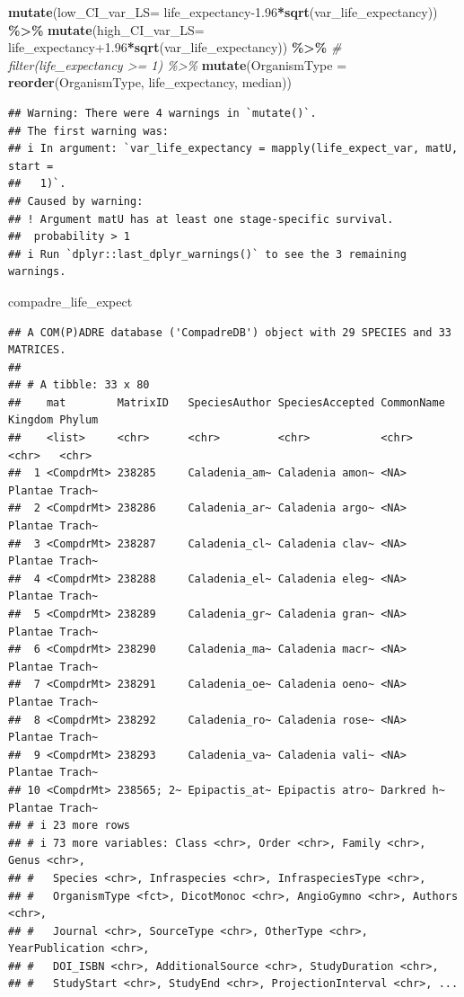 \documentclass[
]{book}
\newenvironment{Shaded}{\begin{snugshade}}{\end{snugshade}}
\newcommand{\AttributeTok}[1]{\textcolor[rgb]{0.13,0.29,0.53}{#1}}
\newcommand{\CommentTok}[1]{\textcolor[rgb]{0.56,0.35,0.01}{\textit{#1}}}
\newcommand{\FloatTok}[1]{\textcolor[rgb]{0.00,0.00,0.81}{#1}}
\newcommand{\FunctionTok}[1]{\textcolor[rgb]{0.13,0.29,0.53}{\textbf{#1}}}
\newcommand{\NormalTok}[1]{#1}
\newcommand{\SpecialCharTok}[1]{\textcolor[rgb]{0.81,0.36,0.00}{\textbf{#1}}}
\theoremstyle{definition}
\theoremstyle{definition}
\theoremstyle{definition}
\theoremstyle{definition}
\theoremstyle{remark}
\begin{document}
\begin{Shaded}
\begin{Highlighting}[]
  \FunctionTok{mutate}\NormalTok{(}\AttributeTok{low\_CI\_var\_LS=}\NormalTok{ life\_expectancy}\FloatTok{{-}1.96}\SpecialCharTok{*}\FunctionTok{sqrt}\NormalTok{(var\_life\_expectancy)) }\SpecialCharTok{\%\textgreater{}\%} 
  \FunctionTok{mutate}\NormalTok{(}\AttributeTok{high\_CI\_var\_LS=}\NormalTok{ life\_expectancy}\FloatTok{+1.96}\SpecialCharTok{*}\FunctionTok{sqrt}\NormalTok{(var\_life\_expectancy)) }\SpecialCharTok{\%\textgreater{}\%} 
 \CommentTok{\# filter(life\_expectancy \textgreater{}= 1) \%\textgreater{}\% }
  \FunctionTok{mutate}\NormalTok{(}\AttributeTok{OrganismType =} \FunctionTok{reorder}\NormalTok{(OrganismType, life\_expectancy, median)) }
\end{Highlighting}
\end{Shaded}

\begin{verbatim}
## Warning: There were 4 warnings in `mutate()`.
## The first warning was:
## i In argument: `var_life_expectancy = mapply(life_expect_var, matU, start =
##   1)`.
## Caused by warning:
## ! Argument matU has at least one stage-specific survival.
##  probability > 1
## i Run `dplyr::last_dplyr_warnings()` to see the 3 remaining warnings.
\end{verbatim}

\begin{Shaded}
\begin{Highlighting}[]
\NormalTok{compadre\_life\_expect}
\end{Highlighting}
\end{Shaded}

\begin{verbatim}
## A COM(P)ADRE database ('CompadreDB') object with 29 SPECIES and 33 MATRICES.
## 
## # A tibble: 33 x 80
##    mat        MatrixID   SpeciesAuthor SpeciesAccepted CommonName Kingdom Phylum
##    <list>     <chr>      <chr>         <chr>           <chr>      <chr>   <chr> 
##  1 <CompdrMt> 238285     Caladenia_am~ Caladenia amon~ <NA>       Plantae Trach~
##  2 <CompdrMt> 238286     Caladenia_ar~ Caladenia argo~ <NA>       Plantae Trach~
##  3 <CompdrMt> 238287     Caladenia_cl~ Caladenia clav~ <NA>       Plantae Trach~
##  4 <CompdrMt> 238288     Caladenia_el~ Caladenia eleg~ <NA>       Plantae Trach~
##  5 <CompdrMt> 238289     Caladenia_gr~ Caladenia gran~ <NA>       Plantae Trach~
##  6 <CompdrMt> 238290     Caladenia_ma~ Caladenia macr~ <NA>       Plantae Trach~
##  7 <CompdrMt> 238291     Caladenia_oe~ Caladenia oeno~ <NA>       Plantae Trach~
##  8 <CompdrMt> 238292     Caladenia_ro~ Caladenia rose~ <NA>       Plantae Trach~
##  9 <CompdrMt> 238293     Caladenia_va~ Caladenia vali~ <NA>       Plantae Trach~
## 10 <CompdrMt> 238565; 2~ Epipactis_at~ Epipactis atro~ Darkred h~ Plantae Trach~
## # i 23 more rows
## # i 73 more variables: Class <chr>, Order <chr>, Family <chr>, Genus <chr>,
## #   Species <chr>, Infraspecies <chr>, InfraspeciesType <chr>,
## #   OrganismType <fct>, DicotMonoc <chr>, AngioGymno <chr>, Authors <chr>,
## #   Journal <chr>, SourceType <chr>, OtherType <chr>, YearPublication <chr>,
## #   DOI_ISBN <chr>, AdditionalSource <chr>, StudyDuration <chr>,
## #   StudyStart <chr>, StudyEnd <chr>, ProjectionInterval <chr>, ...
\end{verbatim}
\end{document}
